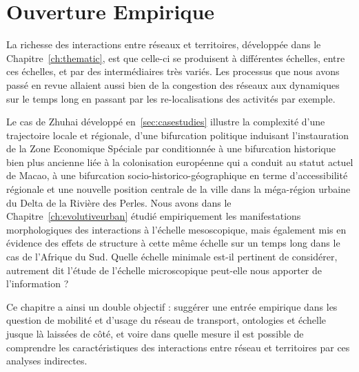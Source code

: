 




\chapter{Ouverture Empirique}

\label{ch:micro} %







La richesse des interactions entre réseaux et territoires, développée dans le Chapitre~\ref{ch:thematic}, est que celle-ci se produisent à différentes échelles, entre ces échelles, et par des intermédiaires très variés. Les processus que nous avons passé en revue allaient aussi bien de la congestion des réseaux aux dynamiques sur le temps long en passant par les re-localisations des activités par exemple.


Le cas de Zhuhai développé en~\ref{sec:casestudies} illustre la complexité d'une trajectoire locale et régionale, d'une bifurcation politique induisant l'instauration de la Zone Economique Spéciale par  conditionnée à une bifurcation historique bien plus ancienne liée à la colonisation européenne qui a conduit au statut actuel de Macao, à une bifurcation socio-historico-géographique en terme d'accessibilité régionale et une nouvelle position centrale de la ville dans la méga-région urbaine du Delta de la Rivière des Perles. Nous avons dans le Chapitre~\ref{ch:evolutiveurban} étudié empiriquement les manifestations morphologiques des interactions à l'échelle mesoscopique, mais également mis en évidence des effets de structure à cette même échelle sur un temps long dans le cas de l'Afrique du Sud. Quelle échelle minimale est-il pertinent de considérer, autrement dit l'étude de l'échelle microscopique peut-elle nous apporter de l'information ? 

Ce chapitre a ainsi un double objectif : suggérer une entrée empirique dans les question de mobilité et d'usage du réseau de transport, ontologies et échelle jusque là laissées de côté, et voire dans quelle mesure il est possible de comprendre les caractéristiques des interactions entre réseau et territoires par ces analyses indirectes.



